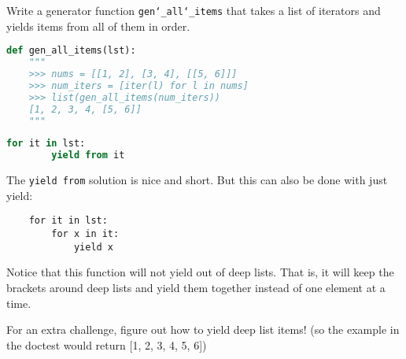 \question Write a generator function \texttt{gen\char`_all\char`_items} that
takes a list of iterators and yields items from all of them in order.

\begin{lstlisting}[language=Python]
def gen_all_items(lst):
    """
    >>> nums = [[1, 2], [3, 4], [[5, 6]]]
    >>> num_iters = [iter(l) for l in nums]
    >>> list(gen_all_items(num_iters))
    [1, 2, 3, 4, [5, 6]]
    """
\end{lstlisting}

\begin{solution}[0.75in]
\begin{lstlisting}[language=Python]
    for it in lst:
        yield from it
\end{lstlisting}

The \texttt{yield from} solution is nice and short. But this can also be done
with just yield:
\begin{lstlisting}
    for it in lst:
        for x in it:
            yield x
\end{lstlisting}

Notice that this function will not yield out of deep lists. That is, it will
keep the brackets around deep lists and yield them together instead of one
element at a time.

For an extra challenge, figure out how to yield deep list items! (so the example
in the doctest would return [1, 2, 3, 4, 5, 6])
\end{solution}
